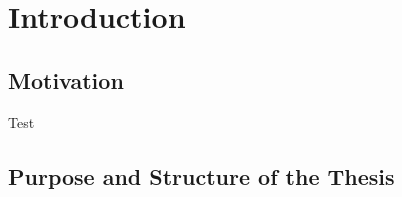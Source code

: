 \chapter{Introduction}

\section{Motivation}
Test\cite{Ledwaba2019}
\section{Purpose and Structure of the Thesis}